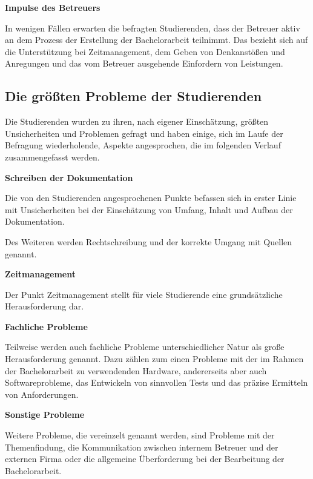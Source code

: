 \documentclass[bibliography=totoc,listof=totoc,BCOR=5mm,DIV=12,oneside]{scrbook}
\begin{document}
\par \medskip \textbf{Impulse des Betreuers}
\par In wenigen Fällen erwarten die befragten Studierenden, dass der Betreuer aktiv an dem Prozess der Erstellung der Bachelorarbeit teilnimmt. Das bezieht sich auf die Unterstützung bei Zeitmanagement, dem Geben von Denkanstößen und Anregungen und das vom Betreuer ausgehende Einfordern von Leistungen.

\subsection{Die größten Probleme der Studierenden}
\par Die Studierenden wurden zu ihren, nach eigener Einschätzung, größten Unsicherheiten und Problemen gefragt und haben einige, sich im Laufe der Befragung wiederholende, Aspekte angesprochen, die im folgenden Verlauf zusammengefasst werden.

\par \bigskip \textbf{Schreiben der Dokumentation}
\par Die von den Studierenden angesprochenen Punkte befassen sich in erster Linie mit Unsicherheiten bei der Einschätzung von Umfang, Inhalt und Aufbau der Dokumentation. 
\par Des Weiteren werden Rechtschreibung und der korrekte Umgang mit Quellen genannt.

\par \bigskip \textbf{Zeitmanagement}
\par Der Punkt Zeitmanagement stellt für viele Studierende eine grundsätzliche Herausforderung dar.

\par \bigskip \textbf{Fachliche Probleme}
\par Teilweise werden auch fachliche Probleme unterschiedlicher Natur als große Herausforderung genannt. Dazu zählen zum einen Probleme mit der im Rahmen der Bachelorarbeit zu verwendenden Hardware, andererseits aber auch Softwareprobleme, das Entwickeln von sinnvollen Tests und das präzise Ermitteln von Anforderungen.

\par \bigskip \textbf{Sonstige Probleme}
\par Weitere Probleme, die vereinzelt genannt werden, sind Probleme mit der Themenfindung, die Kommunikation zwischen internem Betreuer und der externen Firma oder die allgemeine Überforderung bei der Bearbeitung der Bachelorarbeit.
\end{document}
